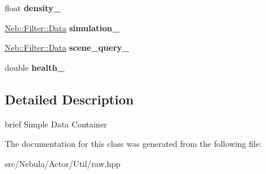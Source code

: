 \begin{DoxyCompactItemize}
\item 
\hypertarget{classNeb_1_1Actor_1_1Util_1_1Raw_ad5fd3d4b695b8992224c7c0da8bda44f}{float {\bfseries density\-\_\-}}\label{classNeb_1_1Actor_1_1Util_1_1Raw_ad5fd3d4b695b8992224c7c0da8bda44f}

\item 
\hypertarget{classNeb_1_1Actor_1_1Util_1_1Raw_a8a7fce3b6fcbef5900051ee4c030f232}{\hyperlink{classNeb_1_1Filter_1_1Data}{\-Neb\-::\-Filter\-::\-Data} {\bfseries simulation\-\_\-}}\label{classNeb_1_1Actor_1_1Util_1_1Raw_a8a7fce3b6fcbef5900051ee4c030f232}

\item 
\hypertarget{classNeb_1_1Actor_1_1Util_1_1Raw_a60a289fefdfb2a5587d6153def4725b5}{\hyperlink{classNeb_1_1Filter_1_1Data}{\-Neb\-::\-Filter\-::\-Data} {\bfseries scene\-\_\-query\-\_\-}}\label{classNeb_1_1Actor_1_1Util_1_1Raw_a60a289fefdfb2a5587d6153def4725b5}

\item 
\hypertarget{classNeb_1_1Actor_1_1Util_1_1Raw_a3de204fcfb553c73efd87c8bc04e3c43}{double {\bfseries health\-\_\-}}\label{classNeb_1_1Actor_1_1Util_1_1Raw_a3de204fcfb553c73efd87c8bc04e3c43}

\end{DoxyCompactItemize}


\subsection{\-Detailed \-Description}
brief \-Simple \-Data \-Container 

\-The documentation for this class was generated from the following file\-:\begin{DoxyCompactItemize}
\item 
src/\-Nebula/\-Actor/\-Util/raw.\-hpp\end{DoxyCompactItemize}
